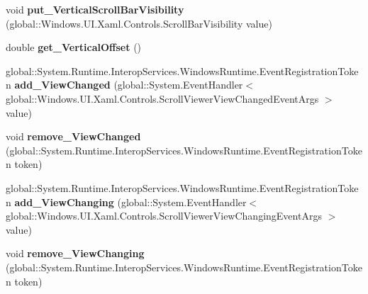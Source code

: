 \begin{DoxyCompactItemize}
\item 
\mbox{\label{class_windows_1_1_u_i_1_1_xaml_1_1_controls_1_1_scroll_viewer_a4ebc42955ec0b6a9d1bb937a99db8d5a}} 
void {\bfseries put\+\_\+\+Vertical\+Scroll\+Bar\+Visibility} (global\+::\+Windows.\+U\+I.\+Xaml.\+Controls.\+Scroll\+Bar\+Visibility value)
\item 
\mbox{\label{class_windows_1_1_u_i_1_1_xaml_1_1_controls_1_1_scroll_viewer_a19208c9fc6f7a5b20ce2809e891eaf0a}} 
double {\bfseries get\+\_\+\+Vertical\+Offset} ()
\item 
\mbox{\label{class_windows_1_1_u_i_1_1_xaml_1_1_controls_1_1_scroll_viewer_ac4976aefef665f53fb870e4ce8813d73}} 
global\+::\+System.\+Runtime.\+Interop\+Services.\+Windows\+Runtime.\+Event\+Registration\+Token {\bfseries add\+\_\+\+View\+Changed} (global\+::\+System.\+Event\+Handler$<$ global\+::\+Windows.\+U\+I.\+Xaml.\+Controls.\+Scroll\+Viewer\+View\+Changed\+Event\+Args $>$ value)
\item 
\mbox{\label{class_windows_1_1_u_i_1_1_xaml_1_1_controls_1_1_scroll_viewer_a317f11553250f27cac32f2a138b5c4b4}} 
void {\bfseries remove\+\_\+\+View\+Changed} (global\+::\+System.\+Runtime.\+Interop\+Services.\+Windows\+Runtime.\+Event\+Registration\+Token token)
\item 
\mbox{\label{class_windows_1_1_u_i_1_1_xaml_1_1_controls_1_1_scroll_viewer_a8696c8cbca169c5458cf7c1bc6e483a9}} 
global\+::\+System.\+Runtime.\+Interop\+Services.\+Windows\+Runtime.\+Event\+Registration\+Token {\bfseries add\+\_\+\+View\+Changing} (global\+::\+System.\+Event\+Handler$<$ global\+::\+Windows.\+U\+I.\+Xaml.\+Controls.\+Scroll\+Viewer\+View\+Changing\+Event\+Args $>$ value)
\item 
\mbox{\label{class_windows_1_1_u_i_1_1_xaml_1_1_controls_1_1_scroll_viewer_a4ab42f006f295d28bd3080f99f149352}} 
void {\bfseries remove\+\_\+\+View\+Changing} (global\+::\+System.\+Runtime.\+Interop\+Services.\+Windows\+Runtime.\+Event\+Registration\+Token token)

\end{DoxyCompactItemize}
